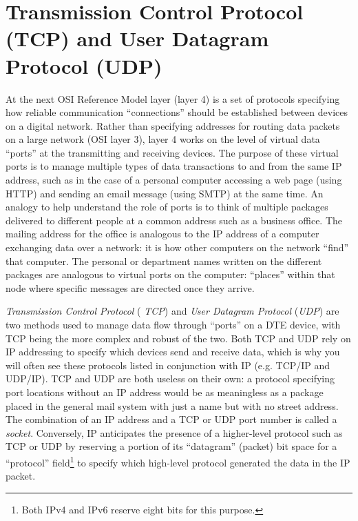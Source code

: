 \filbreak
\section{Transmission Control Protocol (TCP) and User Datagram Protocol (UDP)}

At the next OSI Reference Model layer (layer 4) is a set of protocols specifying how reliable communication ``connections'' should be established between devices on a digital network.  Rather than specifying addresses for routing data packets on a large network (OSI layer 3), layer 4 works on the level of virtual data ``ports'' at the transmitting and receiving devices.  The purpose of these virtual ports is to manage multiple types of data transactions to and from the same IP address, such as in the case of a personal computer accessing a web page (using HTTP) and sending an email message (using SMTP) at the same time.  An analogy to help understand the role of ports is to think of multiple packages delivered to different people at a common address such as a business office.  The mailing address for the office is analogous to the IP address of a computer exchanging data over a network: it is how other computers on the network ``find'' that computer.  The personal or department names written on the different packages are analogous to virtual ports on the computer: ``places'' within that node where specific messages are directed once they arrive.

\textit{Transmission Control Protocol} ( \textit{TCP}) and \textit{User Datagram Protocol} (\textit{UDP}) are two methods used to manage data flow through ``ports'' on a DTE device, with TCP being the more complex and robust of the two.  Both TCP and UDP rely on IP addressing to specify which devices send and receive data, which is why you will often see these protocols listed in conjunction with IP (e.g. TCP/IP and UDP/IP).  TCP and UDP are both useless on their own: a protocol specifying port locations without an IP address would be as meaningless as a package placed in the general mail system with just a name but with no street address.  The combination of an IP address and a TCP or UDP port number is called a \textit{socket}.  Conversely, IP anticipates the presence of a higher-level protocol such as TCP or UDP by reserving a portion of its ``datagram'' (packet) bit space for a ``protocol'' field\footnote{Both IPv4 and IPv6 reserve eight bits for this purpose.} to specify which high-level protocol generated the data in the IP packet.          

